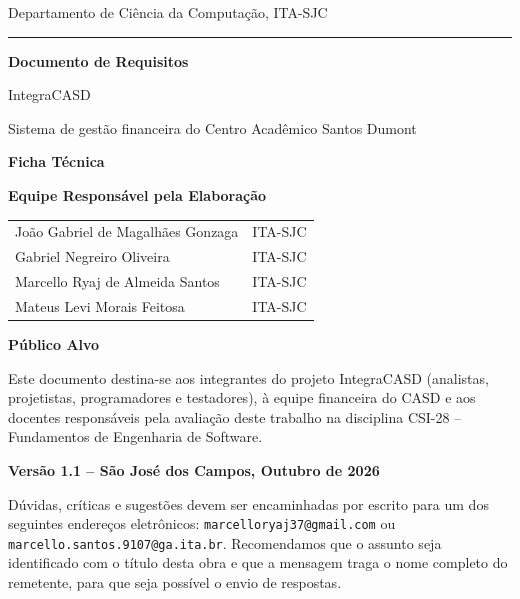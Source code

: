 \documentclass[11pt,a4paper,oneside]{report}
\begin{document}

\begin{titlepage}
  \pagestyle{empty}
  {\large Departamento de Ciência da Computação, ITA-SJC\par}
  \vspace{0.5em}
  {\color{casdamarelo}\rule{\linewidth}{2pt}\par}
  \vspace{2em}
  {\Huge\bfseries Documento de Requisitos\par}
  \vspace{0.5em}
  {\LARGE IntegraCASD\par}
  \vspace{0.3em}
  {\large Sistema de gestão financeira do Centro Acadêmico Santos Dumont\par}

  \vspace{3em}
  {\large\bfseries Ficha Técnica\par}
  \vspace{1em}
  \textbf{Equipe Responsável pela Elaboração}\par
  \begin{tabular}{@{}ll@{}}
    João Gabriel de Magalhães Gonzaga & ITA-SJC \\
    Gabriel Negreiro Oliveira         & ITA-SJC \\
    Marcello Ryaj de Almeida Santos   & ITA-SJC \\
    Mateus Levi Morais Feitosa        & ITA-SJC \\
  \end{tabular}

  \vspace{1.5em}
  \textbf{Público Alvo}\par
  Este documento destina-se aos integrantes do projeto IntegraCASD (analistas, projetistas,
  programadores e testadores), à equipe financeira do CASD e aos docentes responsáveis pela
  avaliação deste trabalho na disciplina CSI-28 -- Fundamentos de Engenharia de Software.

  \vfill
  \begin{center}
    {\large\bfseries Versão 1.1 -- São José dos Campos, Outubro de 2026\par}
  \end{center}
  \vspace{1em}
  Dúvidas, críticas e sugestões devem ser encaminhadas por escrito para um dos seguintes endereços
  eletrônicos: \texttt{marcelloryaj37@gmail.com} ou \texttt{marcello.santos.9107@ga.ita.br}.
  Recomendamos que o assunto seja identificado com o título desta obra e que a mensagem traga o
  nome completo do remetente, para que seja possível o envio de respostas.
\end{titlepage}
\end{document}
